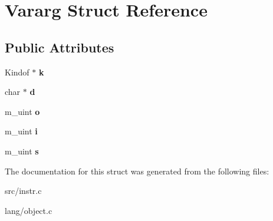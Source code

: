 \hypertarget{structVararg}{}\section{Vararg Struct Reference}
\label{structVararg}
\subsection*{Public Attributes}
\begin{DoxyCompactItemize}
\item 
\hypertarget{structVararg_a7b84f2b2306399cd2c0339d3f6a61d1b}{}\label{structVararg_a7b84f2b2306399cd2c0339d3f6a61d1b} 
Kindof $\ast$ {\bfseries k}
\item 
\hypertarget{structVararg_a0f5b7dedb1c03583287fa80a8797e057}{}\label{structVararg_a0f5b7dedb1c03583287fa80a8797e057} 
char $\ast$ {\bfseries d}
\item 
\hypertarget{structVararg_a064723ca702a82d26e848cd81785ff08}{}\label{structVararg_a064723ca702a82d26e848cd81785ff08} 
m\+\_\+uint {\bfseries o}
\item 
\hypertarget{structVararg_a82279e7edbb3d0c68439f59e58907fed}{}\label{structVararg_a82279e7edbb3d0c68439f59e58907fed} 
m\+\_\+uint {\bfseries i}
\item 
\hypertarget{structVararg_a4771fba7205f5d2df394fbe03807e0a8}{}\label{structVararg_a4771fba7205f5d2df394fbe03807e0a8} 
m\+\_\+uint {\bfseries s}
\end{DoxyCompactItemize}


The documentation for this struct was generated from the following files\+:\begin{DoxyCompactItemize}
\item 
src/instr.\+c\item 
lang/object.\+c\end{DoxyCompactItemize}

